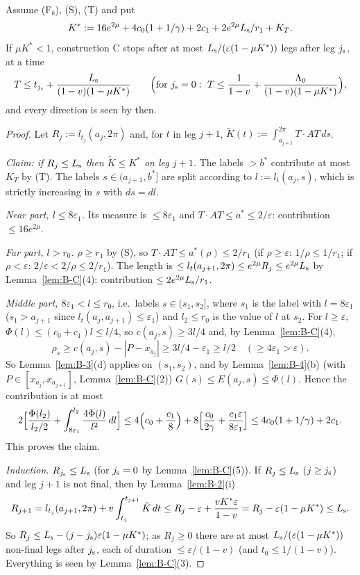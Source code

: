 \begin{theorem}[R: reduction]\label{thm:R}
Assume \textup{(F$_b$)}, \textup{(S)}, \textup{(T)} and put
\[
K^*:=16e^{2\mu}+4c_0(1+1/\gamma)+2c_1+2e^{2\mu}L_{\mathrm s}/r_1+K_T .
\]
If $\mu K^*<1$, construction C stops after at most $L_{\mathrm s}/(\varepsilon(1-\mu K^*))$ legs after leg $j_{\mathrm s}$, at a time
\[
T\le t_{\Bjs}+\frac{\BLs}{(1-v)(1-\mu K^*)}\qquad\Bigl(\text{for }\Bjs=0:\ T\le\frac1{1-v}+\frac{\Lambda_0}{(1-v)(1-\mu K^*)}\Bigr),
\]
and every direction is seen by then.
\end{theorem}
\begin{proof}
Let $R_j:=l_{t_j}(a_j,2\pi)$ and, for $t$ in leg $j+1$, $\tilde K(t):=\int_{a_{j+1}}^{2\pi}T\cdot AT\,ds$.

\emph{Claim: if $R_j\le L_{\mathrm s}$ then $\tilde K\le K^*$ on leg $j+1$.} The labels $>b^*$ contribute at most $K_T$ by \textup{(T)}. The
labels $s\in(a_{j+1},b^*]$ are split according to $l:=l_t(a_j,s)$, which is strictly increasing in $s$ with $ds=dl$.

\emph{Near part, $l\le8\varepsilon_1$.} Its measure is $\le8\varepsilon_1$ and $T\cdot AT\le a^*\le2/\varepsilon$: contribution
$\le16e^{2\mu}$.

\emph{Far part, $l>r_0$.} $\rho\ge r_1$ by \textup{(S)}, so $T\cdot AT\le a^*(\rho)\le2/r_1$ (if $\rho\ge\varepsilon$:
$1/\rho\le1/r_1$; if $\rho<\varepsilon$: $2/\varepsilon<2/\rho\le2/r_1$). The length is
$\le l_t(a_{j+1},2\pi)\le e^{2\mu}R_j\le e^{2\mu}L_{\mathrm s}$ by Lemma~\ref{lem:B-C}(4): contribution $\le2e^{2\mu}L_{\mathrm s}/r_1$.

\emph{Middle part, $8\varepsilon_1<l\le r_0$}, i.e.\ labels $s\in(s_1,s_2]$, where $s_1$ is the label with $l=8\varepsilon_1$
($s_1>a_{j+1}$ since $l_t(a_j,a_{j+1})\le\varepsilon_1$) and $l_2\le r_0$ is the value of $l$ at $s_2$. For $l\ge\varepsilon$,
$\Phi(l)\le(c_0+c_1)l\le l/4$, so $c(a_j,s)\ge3l/4$ and, by Lemma~\ref{lem:B-C}(4),
\[
\rho_s\ge c(a_j,s)-|P-x_{a_j}|\ge3l/4-\varepsilon_1\ge l/2\quad(\ge4\varepsilon_1>\varepsilon).
\]
So Lemma~\ref{lem:B-3}(d) applies on $(s_1,s_2)$, and by Lemma~\ref{lem:B-4}(b) (with $P\in[x_{a_j},x_{a_{j+1}}]$,
Lemma~\ref{lem:B-C}(2)) $G(s)\le E(a_j,s)\le\Phi(l)$. Hence the contribution is at most
\[
2\Bigl[\frac{\Phi(l_2)}{l_2/2}+\int_{8\varepsilon_1}^{l_2}\frac{4\Phi(l)}{l^2}\,dl\Bigr]
\le4\Bigl(c_0+\frac{c_1}8\Bigr)+8\Bigl[\frac{c_0}{2\gamma}+\frac{c_1\varepsilon}{8\varepsilon_1}\Bigr]\le4c_0(1+1/\gamma)+2c_1 .
\]
This proves the claim.

\emph{Induction.} $R_{j_{\mathrm s}}\le L_{\mathrm s}$ (for $j_{\mathrm s}=0$ by Lemma~\ref{lem:B-C}(5)). If $R_j\le L_{\mathrm s}$ ($j\ge j_{\mathrm s}$) and leg $j+1$ is not
final, then by Lemma~\ref{lem:B-2}(i)
\[
R_{j+1}=l_{t_j}(a_{j+1},2\pi)+v\int_{t_j}^{t_{j+1}}\tilde K\,dt\le R_j-\varepsilon+\frac{vK^*\varepsilon}{1-v}
=R_j-\varepsilon(1-\mu K^*)\le L_{\mathrm s} .
\]
So $R_j\le L_{\mathrm s}-(j-j_{\mathrm s})\varepsilon(1-\mu K^*)$; as $R_j\ge0$ there are at most $L_{\mathrm s}/(\varepsilon(1-\mu K^*))$ non-final legs after
$j_{\mathrm s}$, each of duration $\le\varepsilon/(1-v)$ (and $t_0\le1/(1-v)$). Everything is seen by Lemma~\ref{lem:B-C}(3).
\end{proof}

